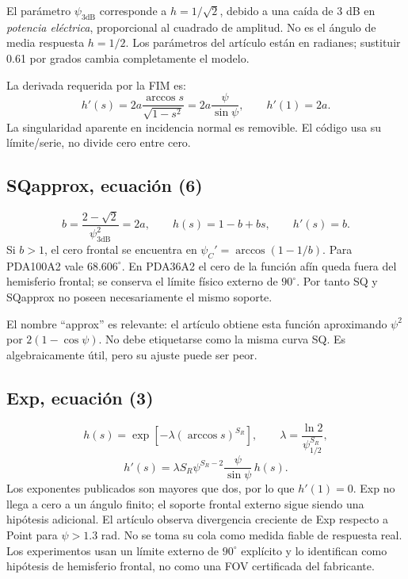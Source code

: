 \documentclass[11pt,a4paper]{article}
\begin{document}
El parámetro $\psi_{3\mathrm{dB}}$ corresponde a $h=1/\sqrt2$, debido a una caída de 3 dB en \emph{potencia eléctrica}, proporcional al cuadrado de amplitud. No es el ángulo de media respuesta $h=1/2$. Los parámetros del artículo están en radianes; sustituir 0.61 por grados cambia completamente el modelo.

La derivada requerida por la FIM es:
\begin{equation}
 h'(s)=2a\frac{\arccos s}{\sqrt{1-s^2}}=2a\frac\psi{\sin\psi},\qquad
 h'(1)=2a.
\label{eq:sqderivative}
\end{equation}
La singularidad aparente en incidencia normal es removible. El código usa su límite/serie, no divide cero entre cero.

\subsection{SQapprox, ecuación (6)}
\begin{equation}
 b=\frac{2-\sqrt2}{\psi_{3\mathrm{dB}}^2}=2a,\qquad
 h(s)=1-b+bs,\qquad h'(s)=b.
\end{equation}
Si $b>1$, el cero frontal se encuentra en $\psi_C'=\arccos(1-1/b)$. Para PDA100A2 vale $68.606^\circ$. En PDA36A2 el cero de la función afín queda fuera del hemisferio frontal; se conserva el límite físico externo de $90^\circ$. Por tanto SQ y SQapprox no poseen necesariamente el mismo soporte.

El nombre ``approx'' es relevante: el artículo obtiene esta función aproximando $\psi^2$ por $2(1-\cos\psi)$. No debe etiquetarse como la misma curva SQ. Es algebraicamente útil, pero su ajuste puede ser peor.

\subsection{Exp, ecuación (3)}
\begin{equation}
 h(s)=\exp[-\lambda(\arccos s)^{S_R}],\qquad
 \lambda=\frac{\ln2}{\psi_{1/2}^{S_R}},
\end{equation}
\begin{equation}
 h'(s)=\lambda S_R\psi^{S_R-2}\frac\psi{\sin\psi}\,h(s).
\end{equation}
Los exponentes publicados son mayores que dos, por lo que $h'(1)=0$. Exp no llega a cero a un ángulo finito; el soporte frontal externo sigue siendo una hipótesis adicional. El artículo observa divergencia creciente de Exp respecto a Point para $\psi>1.3$ rad. No se toma su cola como medida fiable de respuesta real. Los experimentos usan un límite externo de $90^\circ$ explícito y lo identifican como hipótesis de hemisferio frontal, no como una FOV certificada del fabricante.
\end{document}
